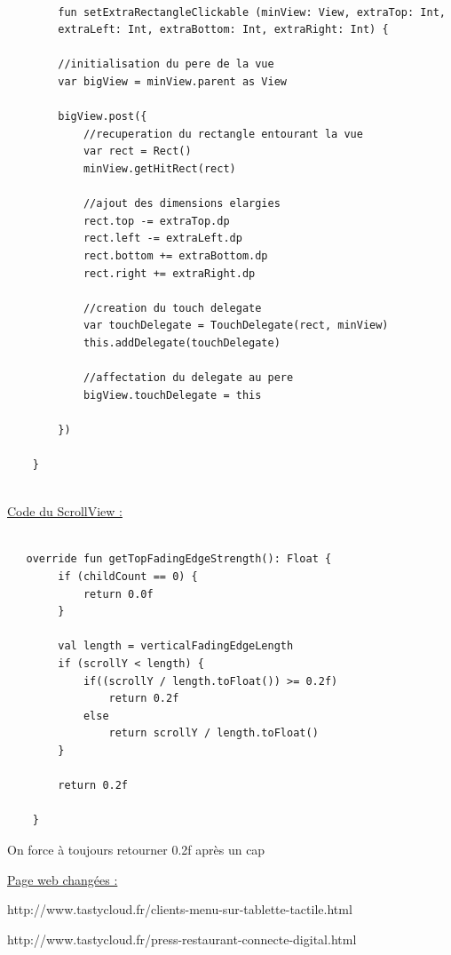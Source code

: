 \begin{lstlisting}[frame=single]  % Start your code-block
    
        fun setExtraRectangleClickable (minView: View, extraTop: Int, 
        extraLeft: Int, extraBottom: Int, extraRight: Int) {

        //initialisation du pere de la vue
        var bigView = minView.parent as View

        bigView.post({
            //recuperation du rectangle entourant la vue
            var rect = Rect()
            minView.getHitRect(rect)

            //ajout des dimensions elargies
            rect.top -= extraTop.dp
            rect.left -= extraLeft.dp
            rect.bottom += extraBottom.dp
            rect.right += extraRight.dp

            //creation du touch delegate
            var touchDelegate = TouchDelegate(rect, minView)
            this.addDelegate(touchDelegate)

            //affectation du delegate au pere
            bigView.touchDelegate = this

        })

    }
    
\end{lstlisting}

\underline{Code du ScrollView :}

\begin{lstlisting}[frame=single]  % Start your code-block
    
   override fun getTopFadingEdgeStrength(): Float {
        if (childCount == 0) {
            return 0.0f
        }

        val length = verticalFadingEdgeLength
        if (scrollY < length) {
            if((scrollY / length.toFloat()) >= 0.2f)
                return 0.2f
            else
                return scrollY / length.toFloat()
        }

        return 0.2f

    }

\end{lstlisting}

On force à toujours retourner 0.2f après un cap

\clearpage
\underline{Page web changées :}

http://www.tastycloud.fr/clients-menu-sur-tablette-tactile.html

http://www.tastycloud.fr/press-restaurant-connecte-digital.html

